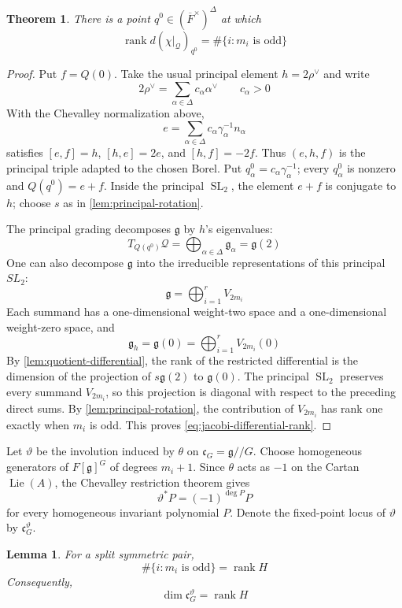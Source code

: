 \documentclass[11pt]{amsart}
\newtheorem{theorem}{Theorem}[section]
\newtheorem{lemma}[lemma]{Lemma}
\theoremstyle{definition}
\theoremstyle{remark}
\newcommand{\Fb}{\overline F}
\newcommand{\cQ}{\mathcal Q}
\newcommand{\Lie}{\operatorname{Lie}}
\newcommand{\rank}{\operatorname{rank}}
\newcommand{\SL}{\operatorname{SL}}
\newcommand{\cC}{\mathfrak c}
\newcommand{\g}{\mathfrak g}
\begin{document}
\begin{theorem}\label{thm:jacobi-rank}
There is a point $q^0\in(\Fb^\times)^\Delta$ at which
\begin{equation}\label{eq:jacobi-differential-rank}
 \rank d(\chi|_{\cQ})_{q^0}
 =\#\{i:m_i\text{ is odd}\}
\end{equation}
\end{theorem}

\begin{proof}
Put $f=Q(0)$.  Take the usual principal element $h=2\rho^\vee$ and write
\[
 2\rho^\vee=\sum_{\alpha\in\Delta}c_\alpha\alpha^\vee
 \qquad c_\alpha>0
\]
With the Chevalley normalization above,
\[
 e=\sum_{\alpha\in\Delta}
      c_\alpha\gamma_\alpha^{-1}n_\alpha
\]
satisfies $[e,f]=h$, $[h,e]=2e$, and $[h,f]=-2f$.  Thus $(e,h,f)$ is the
principal triple adapted to the chosen Borel.  Put
$q^0_\alpha=c_\alpha\gamma_\alpha^{-1}$; every $q^0_\alpha$ is nonzero and
$Q(q^0)=e+f$.  Inside the principal $\SL_2$, the element $e+f$ is conjugate
to $h$; choose $s$ as in \cref{lem:principal-rotation}.

The principal grading decomposes $\mathfrak{g}$ by $h$'s eigenvalues:
\[
 T_{Q(q^0)}\cQ=\bigoplus_{\alpha\in\Delta}\g_\alpha=\g(2)
\]
One can also decompose $\mathfrak{g}$ into the irreducible representations of this principal $SL_2$: 
\[
 \g=\bigoplus_{i=1}^r V_{2m_i}
\]
Each summand has a one-dimensional weight-two space and a one-dimensional
weight-zero space, and
\[
 \g_h=\g(0)=\bigoplus_{i=1}^r V_{2m_i}(0)
\]
By \cref{lem:quotient-differential}, the rank of the restricted differential
is the dimension of the projection of $s\g(2)$ to $\g(0)$.  The principal
$\SL_2$ preserves every summand $V_{2m_i}$, so this projection is diagonal
with respect to the preceding direct sums.  By
\cref{lem:principal-rotation}, the contribution of $V_{2m_i}$ has rank one
exactly when $m_i$ is odd.  This proves
\eqref{eq:jacobi-differential-rank}.
\end{proof}

Let $\vartheta$ be the involution induced by $\theta$ on
$\cC_G=\g/\!/G$.  Choose homogeneous generators of $F[\g]^G$ of degrees
$m_i+1$.  Since $\theta$ acts as $-1$ on the Cartan $\Lie(A)$, the Chevalley
restriction theorem gives
\[
 \vartheta^*P=(-1)^{\deg P}P
\]
for every homogeneous invariant polynomial $P$.  Denote the fixed-point
locus of $\vartheta$ by $\cC_G^\vartheta$.

\begin{lemma}\label{lem:odd-exponents-rank-h}
For a split symmetric pair,
\[
 \#\{i:m_i\text{ is odd}\}=\rank H
\]
Consequently,
\[
 \dim\cC_G^\vartheta=\rank H
\]
\end{lemma}
\end{document}
